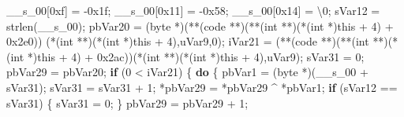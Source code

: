 \documentclass[
]{article}
\newenvironment{Shaded}{}{}
\newcommand{\BaseNTok}[1]{\textcolor[rgb]{0.25,0.63,0.44}{#1}}
\newcommand{\CharTok}[1]{\textcolor[rgb]{0.25,0.44,0.63}{#1}}
\newcommand{\ControlFlowTok}[1]{\textcolor[rgb]{0.00,0.44,0.13}{\textbf{#1}}}
\newcommand{\DataTypeTok}[1]{\textcolor[rgb]{0.56,0.13,0.00}{#1}}
\newcommand{\DecValTok}[1]{\textcolor[rgb]{0.25,0.63,0.44}{#1}}
\newcommand{\NormalTok}[1]{#1}
\newcommand{\OperatorTok}[1]{\textcolor[rgb]{0.40,0.40,0.40}{#1}}
\newcommand{\SpecialCharTok}[1]{\textcolor[rgb]{0.25,0.44,0.63}{#1}}
\begin{document}
\begin{Shaded}
\begin{Highlighting}[]
\NormalTok{  \_\_s\_00}\OperatorTok{[}\BaseNTok{0xf}\OperatorTok{]} \OperatorTok{=} \OperatorTok{{-}}\BaseNTok{0x1f}\OperatorTok{;}
\NormalTok{  \_\_s\_00}\OperatorTok{[}\BaseNTok{0x11}\OperatorTok{]} \OperatorTok{=} \OperatorTok{{-}}\BaseNTok{0x58}\OperatorTok{;}
\NormalTok{  \_\_s\_00}\OperatorTok{[}\BaseNTok{0x14}\OperatorTok{]} \OperatorTok{=} \CharTok{\textquotesingle{}}\SpecialCharTok{\textbackslash{}0}\CharTok{\textquotesingle{}}\OperatorTok{;}
\NormalTok{  sVar12 }\OperatorTok{=}\NormalTok{ strlen}\OperatorTok{(}\NormalTok{\_\_s\_00}\OperatorTok{);}
\NormalTok{  pbVar20 }\OperatorTok{=} \OperatorTok{(}\NormalTok{byte }\OperatorTok{*)(**(}\NormalTok{code }\OperatorTok{**)(**(}\DataTypeTok{int} \OperatorTok{**)(*(}\DataTypeTok{int} \OperatorTok{*)}\NormalTok{this }\OperatorTok{+} \DecValTok{4}\OperatorTok{)} \OperatorTok{+} \BaseNTok{0x2e0}\OperatorTok{))}
                              \OperatorTok{(*(}\DataTypeTok{int} \OperatorTok{**)(*(}\DataTypeTok{int} \OperatorTok{*)}\NormalTok{this }\OperatorTok{+} \DecValTok{4}\OperatorTok{),}\NormalTok{uVar9}\OperatorTok{,}\DecValTok{0}\OperatorTok{);}
\NormalTok{  iVar21 }\OperatorTok{=} \OperatorTok{(**(}\NormalTok{code }\OperatorTok{**)(**(}\DataTypeTok{int} \OperatorTok{**)(*(}\DataTypeTok{int} \OperatorTok{*)}\NormalTok{this }\OperatorTok{+} \DecValTok{4}\OperatorTok{)} \OperatorTok{+} \BaseNTok{0x2ac}\OperatorTok{))(*(}\DataTypeTok{int} \OperatorTok{**)(*(}\DataTypeTok{int} \OperatorTok{*)}\NormalTok{this }\OperatorTok{+} \DecValTok{4}\OperatorTok{),}\NormalTok{uVar9}\OperatorTok{);}
\NormalTok{  sVar31 }\OperatorTok{=} \DecValTok{0}\OperatorTok{;}
\NormalTok{  pbVar29 }\OperatorTok{=}\NormalTok{ pbVar20}\OperatorTok{;}
  \ControlFlowTok{if} \OperatorTok{(}\DecValTok{0} \OperatorTok{\textless{}}\NormalTok{ iVar21}\OperatorTok{)} \OperatorTok{\{}
    \ControlFlowTok{do} \OperatorTok{\{}
\NormalTok{      pbVar1 }\OperatorTok{=} \OperatorTok{(}\NormalTok{byte }\OperatorTok{*)(}\NormalTok{\_\_s\_00 }\OperatorTok{+}\NormalTok{ sVar31}\OperatorTok{);}
\NormalTok{      sVar31 }\OperatorTok{=}\NormalTok{ sVar31 }\OperatorTok{+} \DecValTok{1}\OperatorTok{;}
      \OperatorTok{*}\NormalTok{pbVar29 }\OperatorTok{=} \OperatorTok{*}\NormalTok{pbVar29 }\OperatorTok{\^{}} \OperatorTok{*}\NormalTok{pbVar1}\OperatorTok{;}
      \ControlFlowTok{if} \OperatorTok{(}\NormalTok{sVar12 }\OperatorTok{==}\NormalTok{ sVar31}\OperatorTok{)} \OperatorTok{\{}
\NormalTok{        sVar31 }\OperatorTok{=} \DecValTok{0}\OperatorTok{;}
      \OperatorTok{\}}
\NormalTok{      pbVar29 }\OperatorTok{=}\NormalTok{ pbVar29 }\OperatorTok{+} \DecValTok{1}\OperatorTok{;}

\end{Highlighting}
\end{Shaded}
\end{document}
